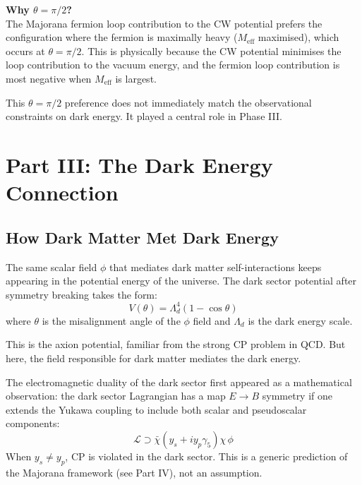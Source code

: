 \documentclass[12pt, a4paper]{article}
\newcommand{\dateentry}[1]{\medskip\noindent{\footnotesize\color{journalgray}\textbf{Date:}~#1}\smallskip}
\begin{document}
\begin{insightbox}
\textbf{Why $\theta = \pi/2$?}\\
The Majorana fermion loop contribution to the CW potential prefers the configuration
where the fermion is maximally heavy ($M_\text{eff}$ maximised), which occurs at $\theta = \pi/2$.
This is physically because the CW potential minimises the loop contribution to the vacuum energy,
and the fermion loop contribution is most negative when $M_\text{eff}$ is largest.
\end{insightbox}

This $\theta = \pi/2$ preference does not immediately match the observational constraints on dark energy. It played a central role in Phase III.

\newpage

\section{Part III: The Dark Energy Connection}

\subsection{How Dark Matter Met Dark Energy}

\dateentry{February 2026}

The same scalar field $\phi$ that mediates dark matter self-interactions keeps appearing in the potential energy of the universe. The dark sector potential after symmetry breaking takes the form:
\begin{equation}
  V(\theta) = \Lambda_d^4\left(1 - \cos\theta\right)
\end{equation}
where $\theta$ is the misalignment angle of the $\phi$ field and $\Lambda_d$ is the dark energy scale.

This is the axion potential, familiar from the strong CP problem in QCD. But here, the field responsible for dark matter mediates the dark energy.

The electromagnetic duality of the dark sector first appeared as a mathematical observation: the dark sector Lagrangian has a map $E \to B$ symmetry if one extends the Yukawa coupling to include both scalar and pseudoscalar components:
\begin{equation}
  \mathcal{L} \supset \bar\chi\left(y_s + iy_p\gamma_5\right)\chi\,\phi
\end{equation}
When $y_s \neq y_p$, CP is violated in the dark sector. This is a generic prediction of the Majorana framework (see Part IV), not an assumption.
\end{document}
